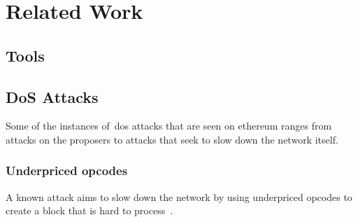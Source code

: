 

\section{Related Work}\label{sec:related-work}
\subsection{Tools}\label{subsec:tools}


%

\subsection{DoS Attacks}\label{subsec:dos-attack}
Some of the instances of~\gls{dos} attacks that are seen on ethereum ranges from attacks on the proposers to attacks that seek to slow down the network itself.

\subsubsection{Underpriced opcodes}\label{subsubsec:underpriced-opcodes}
A known attack aims to slow down the network by using underpriced opcodes to create a block that is hard to process~\cite{10.1145/3391195,9815256}.

